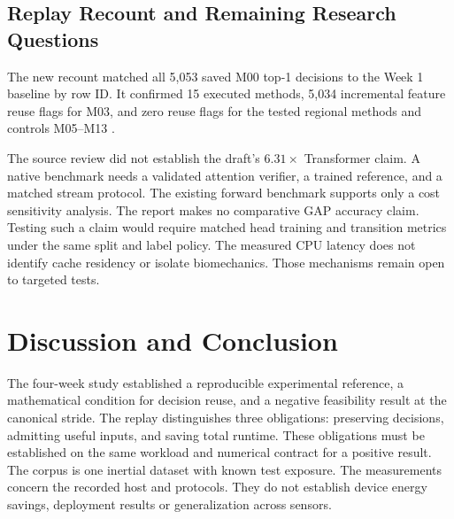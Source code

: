 \documentclass[journal]{IEEEtran}
\begin{document}
\subsection{Replay Recount and Remaining Research Questions}
The new recount matched all 5,053 saved M00 top-1 decisions to the Week 1 baseline by row ID. It confirmed 15 executed methods, 5,034 incremental feature reuse flags for M03, and zero reuse flags for the tested regional methods and controls M05--M13 \cite{localrecount}.
\par
The source review did not establish the draft's $6.31\times$ Transformer claim. A native benchmark needs a validated attention verifier, a trained reference, and a matched stream protocol. The existing forward benchmark supports only a cost sensitivity analysis. The report makes no comparative GAP accuracy claim. Testing such a claim would require matched head training and transition metrics under the same split and label policy. The measured CPU latency does not identify cache residency or isolate biomechanics. Those mechanisms remain open to targeted tests.
\section{Discussion and Conclusion}
The four-week study established a reproducible experimental reference, a mathematical condition for decision reuse, and a negative feasibility result at the canonical stride. The replay distinguishes three obligations: preserving decisions, admitting useful inputs, and saving total runtime. These obligations must be established on the same workload and numerical contract for a positive result. The corpus is one inertial dataset with known test exposure. The measurements concern the recorded host and protocols. They do not establish device energy savings, deployment results or generalization across sensors.
\onecolumn
\raggedbottom
\appendices
\end{document}
